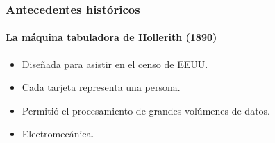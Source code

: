\documentclass[11pt,a4paper,spanish]{beamer}
\begin{document}
\begin{frame}

\frametitle{Antecedentes históricos}
\framesubtitle{La máquina tabuladora de Hollerith (1890)}

\begin{minipage}{0.66\textwidth}

    \begin{itemize}
        \item Diseñada para asistir en el censo de EEUU.
        \item Cada tarjeta representa una persona.
        \item Permitió el procesamiento de grandes volúmenes de datos.
        \item Electromecánica.
    \end{itemize}

\end{minipage}
~
\begin{minipage}{0.3\textwidth}


\end{minipage}
\end{frame}
\end{document}

